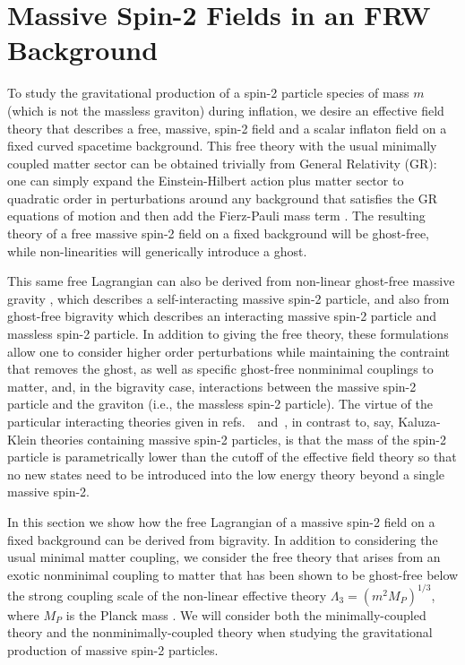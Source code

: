 \documentclass[11pt,a4paper]{article}
\newcommand{\Mpl}{M_P}
\newcommand{\rrefs}[2]{refs.~\cite{#1}~and~\cite{#2}}
\begin{document}
\section{Massive Spin-2 Fields in an FRW Background}
\label{sec:theories}

 To study the gravitational production of a spin-2 particle species of mass $m$ (which is not the massless graviton) during inflation, we desire an effective field theory that describes a free, massive, spin-2 field and a scalar inflaton field on a fixed curved spacetime background. This free theory with the usual minimally coupled matter sector can be obtained trivially from General Relativity (GR): one can simply expand the Einstein-Hilbert action plus matter sector to quadratic order in perturbations around any background that satisfies the GR equations of motion and then add the Fierz-Pauli mass term \cite{Fierz:1939ix}. The resulting theory of a free massive spin-2 field on a fixed background will be ghost-free, while non-linearities will generically introduce a ghost.

This same free Lagrangian can also be derived from non-linear ghost-free massive gravity \cite{deRham:2010kj}, which describes a self-interacting massive spin-2 particle, and also from ghost-free bigravity \cite{Hassan:2011zd} which describes an interacting massive spin-2 particle and massless spin-2 particle. In addition to giving the free theory, these formulations allow one to consider higher order perturbations while maintaining the contraint that removes the ghost, as well as specific ghost-free nonminimal couplings to matter, and, in the bigravity case, interactions between the massive spin-2 particle and the graviton (i.e., the massless spin-2 particle).  The virtue of the particular interacting theories given in \rrefs{Hassan:2011zd}{deRham:2010kj}, in contrast to, say, Kaluza-Klein theories containing massive spin-2 particles, is that the mass of the spin-2 particle is parametrically lower than the cutoff of the effective field theory so that no new states need to be introduced into the low energy theory beyond a single massive spin-2.

In this section we show how the free Lagrangian of a massive spin-2 field on a fixed background can be derived from bigravity.  In addition to considering the usual minimal matter coupling, we consider the free theory that arises from an exotic nonminimal coupling to matter that has been shown to be ghost-free below the strong coupling scale of the non-linear effective theory $\Lambda_3=(m^2\Mpl)^{1/3}$, where $\Mpl$ is the Planck mass \cite{deRham:2014naa}.  We will consider both the minimally-coupled theory and the nonminimally-coupled theory when studying the gravitational production of massive spin-2 particles.  
\end{document}
